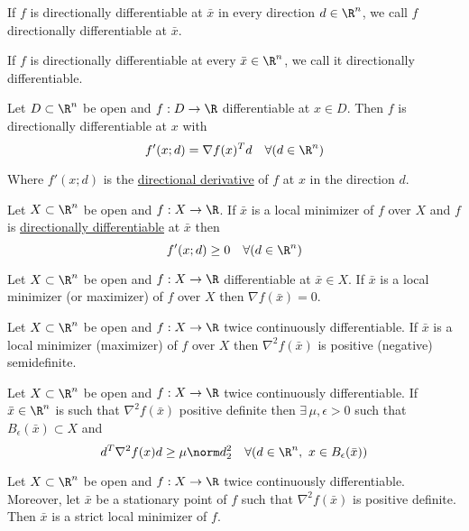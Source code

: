 If $f$ is directionally differentiable at $\bar x$ in every direction
$d\in\R^n$, we call $f$ directionally differentiable at $\bar x$.

If $f$ is directionally differentiable at every $\bar x\in\R^n$, we call it
directionally differentiable.

\label{ed67d29}

Let $D\subset \R^n$ be open and $f:D\to\R$ differentiable at $x\in D$. Then $f$
is directionally differentiable at $x$ with
$$
  f'(x;d)=\nabla f(x)^Td\quad\forall(d\in\R^n)
$$

Where $f'(x;d)$ is the \href{37eb747}{directional derivative} of $f$ at $x$ in
the direction $d$.

\label{b3b5e10}

Let $X\subset\R^n$ be open and $f:X\to\R$. If $\bar x$ is a local minimizer of
$f$ over $X$ and $f$ is \href{37eb747}{directionally differentiable} at $\bar
x$ then
$$
  f'(x;d)\geq 0\quad\forall(d\in\R^n)
$$

\label{dc165c9}

Let $X\subset\R^n$ be open and $f:X\to\R$ differentiable at $\bar x\in X$. If
$\bar x$ is a local minimizer (or maximizer) of $f$ over $X$ then $\nabla
f(\bar x)=0$.

\label{ce5370d}

Let $X\subset\R^n$ be open and $f:X\to\R$ twice continuously differentiable. If
$\bar x$ is a local minimizer (maximizer) of $f$ over $X$ then $\nabla^2f(\bar
x)$ is positive (negative) semidefinite.

\label{eaa0d24}

Let $X\subset\R^n$ be open and $f:X\to\R$ twice continuously differentiable. If
$\bar x\in\R^n$ is such that $\nabla^2f(\bar x)$ positive definite then
$\exists\,\mu,\epsilon>0$ such that $B_\epsilon(\bar x)\subset X$ and
$$
  d^T\nabla^2f(x)d\geq\mu\norm d^2_2\quad\forall(d\in\R^n,\
  x\in B_\epsilon(\bar x))
$$

\label{b43d95d}

Let $X\subset\R^n$ be open and $f:X\to\R$ twice continuously differentiable.
Moreover, let $\bar x$ be a stationary point of $f$ such that $\nabla^2f(\bar
x)$ is positive definite. Then $\bar x$ is a strict local minimizer of $f$.

\label{cd9cea7}


